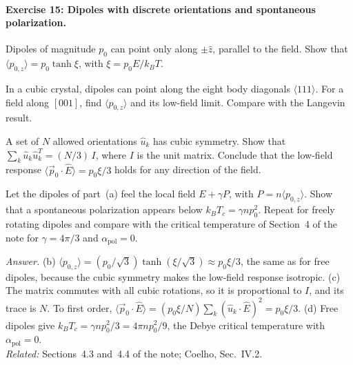 \documentclass[11pt]{article}      %
\numberwithin{equation}{section}   %
\begin{document}
\paragraph{Exercise 15: Dipoles with discrete orientations and spontaneous polarization.}
\begin{parts}
    \item Dipoles of magnitude $p_0$ can point only along $\pm\hat z$, parallel to the field. Show that $\langle p_{0,z}\rangle = p_0\tanh\xi$, with $\xi = p_0E/k_BT$.
    \item In a cubic crystal, dipoles can point along the eight body diagonals $\langle 111\rangle$. For a field along $[001]$, find $\langle p_{0,z}\rangle$ and its low-field limit. Compare with the Langevin result.
    \item A set of $N$ allowed orientations $\hat u_k$ has cubic symmetry. Show that $\sum_k\hat u_k\hat u_k^T = (N/3)\,I$, where $I$ is the unit matrix. Conclude that the low-field response $\langle\vec p_0\cdot\hat E\rangle = p_0\xi/3$ holds for any direction of the field.
    \item Let the dipoles of part~(a) feel the local field $E + \gamma P$, with $P = n\langle p_{0,z}\rangle$. Show that a spontaneous polarization appears below $k_BT_c = \gamma n p_0^2$. Repeat for freely rotating dipoles and compare with the critical temperature of Section~4 of the note for $\gamma = 4\pi/3$ and $\alpha_{\text{pol}} = 0$.
\end{parts}
\textit{Answer.} (b) $\langle p_{0,z}\rangle = (p_0/\sqrt3)\tanh(\xi/\sqrt3) \approx p_0\xi/3$, the same as for free dipoles, because the cubic symmetry makes the low-field response isotropic. (c) The matrix commutes with all cubic rotations, so it is proportional to $I$, and its trace is $N$. To first order, $\langle\vec p_0\cdot\hat E\rangle = (p_0\xi/N)\sum_k(\hat u_k\cdot\hat E)^2 = p_0\xi/3$. (d) Free dipoles give $k_BT_c = \gamma np_0^2/3 = 4\pi np_0^2/9$, the Debye critical temperature with $\alpha_{\text{pol}} = 0$.\\
\textit{Related:} Sections~4.3 and~4.4 of the note; Coelho, Sec.~IV.2.
\end{document}
